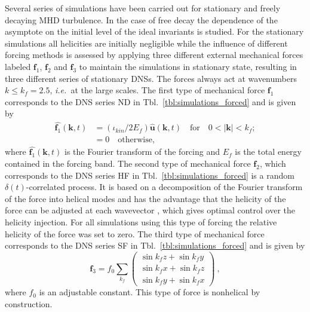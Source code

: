 \documentclass[aps,pre,onecolumn,superscriptaddress,notitlepage]{revtex4-1}
\renewcommand{\vec}[1]{\bm{#1}}
\newcommand{\beq}{\begin{equation}}
\newcommand{\eeq}{\end{equation}}
\begin{document}
Several series of simulations have been carried out for stationary and freely decaying MHD 
turbulence. In the case of free decay the dependence of the asymptote on the initial level
of the ideal invariants is studied. For the stationary simulations all helicities are 
initially negligible while the influence of different forcing methods is assessed by applying 
three different external mechanical forces labeled $\vec{f}_1$, $\vec{f}_2$ and $\vec{f}_3$
to maintain the simulations in stationary state, resulting in three different series of stationary 
DNSs. The forces always act at wavenumbers $k \leqslant k_f =2.5$, {\em i.e.~}at the large scales.
The first type of mechanical force $\vec{f}_1$
corresponds to the DNS series ND in Tbl.~\ref{tbl:simulations_forced} and is 
given by 
\begin{align}
 \hat{\vec{f}_1}(\vec{k},t) &=
      (\iota_{kin}/2 E_f) \hat{\vec{u}}(\vec{k},t) \quad
\text{for} \quad  0 < \lvert\vec{k}\rvert < k_f ; \nonumber \\
  &= 0   \quad \textrm{otherwise},
\label{eq:forcing1}
\end{align}
where $\hat{\vec{f}_1}(\vec{k},t) $ is the Fourier transform of the forcing 
and $E_f$ is the total energy contained in the forcing
band. 
The second type of mechanical force $\vec{f}_2$, which corresponds 
to the DNS series HF in Tbl.~\ref{tbl:simulations_forced} is a random $\delta(t)$-correlated 
process. It is based on a decomposition 
of the Fourier transform of the force into helical modes and 
has the advantage that the helicity of the force can be adjusted 
at each wavevector \cite{Brandenburg01}, which gives 
optimal control over the helicity injection.   
For all simulations using this type of forcing the relative 
helicity of the force was set to zero. 
%
The third type of mechanical force \cite{Dallas14a} corresponds 
to the DNS series SF in Tbl.~\ref{tbl:simulations_forced} and is given by
\beq
\vec{f}_3 = f_0 \sum_{k_f}
 \begin{pmatrix}
    \sin{k_fz} + \sin{k_fy} \\
    \sin{k_fx} + \sin{k_fz} \\
    \sin{k_fy} + \sin{k_fx} 
  \end{pmatrix} \ ,
\label{eq:forcing2}
\eeq
where $f_0$ is an adjustable constant. This type of force is nonhelical by construction. 
\end{document}
